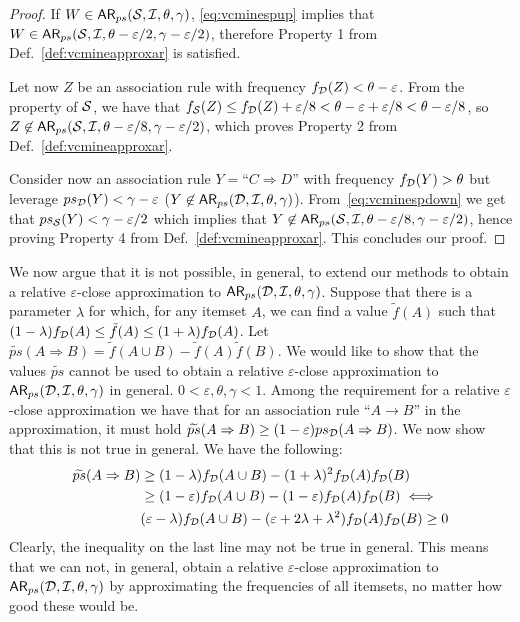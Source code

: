 \begin{proof}
  If $W\in\mathsf{AR}_{ps}({\cal S},{\cal I},\theta,\gamma)$, \eqref{eq:vcminespup} implies that
  $W\in\mathsf{AR}_{ps}({\cal S},{\cal I},\theta-\varepsilon/2,\gamma-\varepsilon/2)$, therefore
  Property 1 from Def.~\ref{def:vcmineapproxar} is satisfied. 

  Let now $Z$ be an association rule with frequency
  $f_{\cal D}(Z)<\theta-\varepsilon$. From the property of ${\cal S}$, we have that
  $f_{\cal S}(Z)\le
  f_{\cal D}(Z)+\varepsilon/8<\theta-\varepsilon+\varepsilon/8<\theta-\varepsilon/8$,
  so $Z\not\in \mathsf{AR}_{ps}({\cal S},{\cal I},\theta-\varepsilon/8,\gamma-\varepsilon/2)$,
  which proves Property 2 from Def.~\ref{def:vcmineapproxar}.

  Consider now an association rule $Y=\mbox{``}C\Rightarrow D\mbox{''}$ with
  frequency $f_{\cal D}(Y)>\theta$ but leverage $ps_{\cal D}(Y)<\gamma-\varepsilon$
  ($Y\not\in\mathsf{AR}_{ps}({\cal D},{\cal I},\theta,\gamma)$).
  From~\eqref{eq:vcminespdown} we get that $ps_{\cal S}(Y)<\gamma-\varepsilon/2$ which
  implies that
  $Y\not\in\mathsf{AR}_{ps}({\cal S},{\cal I},\theta-\varepsilon/8,\gamma-\varepsilon/2)$, hence
  proving Property 4 from Def.~\ref{def:vcmineapproxar}. This concludes our proof.
\end{proof}

We now argue that it is not possible, in general, to extend our methods to
obtain a relative $\varepsilon$-close approximation to
$\mathsf{AR}_{ps}({\cal D},{\cal I},\theta,\gamma)$. Suppose that there is a parameter $\lambda$
for which, for any itemset $A$, we can find a value $\tilde{f}(A)$ such that
$(1-\lambda)f_{\cal D}(A)\le \tilde{f}(A)\le (1+\lambda)f_{\cal D}(A)$. Let
$\widetilde{ps}(A\Rightarrow B)=\tilde{f}(A\cup B)-\tilde{f}(A)\tilde{f}(B)$.
We would like to show that the values $\widetilde{ps}$ cannot be used to obtain
a relative $\varepsilon$-close approximation to
$\mathsf{AR}_{ps}({\cal D},{\cal I},\theta,\gamma)$ in general. %
$0<\varepsilon,\theta,\gamma<1$.
Among the requirement for a relative $\varepsilon$-close approximation we have
that for an association rule ``$A\rightarrow B$'' in the approximation, it must
hold $\widetilde{ps}(A\Rightarrow B)\ge(1-\varepsilon)ps_{\cal D}(A\Rightarrow B)$.
We now show that this is not true in general. We have the following:
\begin{align*}
\widetilde{ps}(A\Rightarrow B)&\ge(1-\lambda)f_{\cal D}(A\cup
B)-(1+\lambda)^2f_{\cal D}(A)f_{\cal D}(B)\\
&\ge(1-\varepsilon)f_{\cal D}(A\cup B)-(1-\varepsilon)f_{\cal D}(A)f_{\cal D}(B) \iff\\
&(\varepsilon-\lambda)f_{\cal D}(A\cup B)-(\varepsilon+2\lambda+\lambda^2)f_{\cal D}(A)f_{\cal D}(B)\ge
0
\end{align*}
Clearly, the inequality on the last line may not be true in general. This means
that we can not, in general, obtain a relative $\varepsilon$-close approximation
to $\mathsf{AR}_{ps}({\cal D},{\cal I},\theta,\gamma)$ by approximating the frequencies of all
itemsets, no matter how good these would be.

